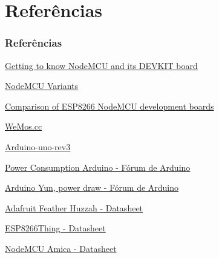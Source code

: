 \documentclass{beamer}
\begin{document}
\section{Referências}
\begin{frame}
\frametitle{Referências}
\begin{thebibliography}{5}
	

	
	\href{https://www.ibm.com/developerworks/library/iot-nodemcu-open-why-use/index.html} {Getting to know NodeMCU and its DEVKIT board}
	
	\href{https://cknodemcu.wordpress.com/2015/11/13/nodemcu-variants/} {NodeMCU Variants}
	
	 \href{https://frightanic.com/iot/comparison-of-esp8266-nodemcu-development-boards/}{Comparison of ESP8266 NodeMCU development boards}
	
	 \href{https://www.wemos.cc/}{WeMos.cc}
	
	\href{https://store.arduino.cc/arduino-uno-rev3} {Arduino-uno-rev3}
	
	\href{http://forum.arduino.cc/index.php?topic=5536.0}{Power Consumption Arduino - Fórum de Arduino}
	
	\href{https://forum.arduino.cc/index.php?topic=188821.0} {Arduino Yun, power draw - Fórum de Arduino}

	\href{https://cdn-learn.adafruit.com/downloads/pdf/adafruit-feather-huzzah-esp8266.pdf}{Adafruit Feather Huzzah - Datasheet}

	\href{https://cdn.sparkfun.com/datasheets/Wireless/WiFi/ESP8266ThingV1.pdf}{ESP8266Thing - Datasheet}
	
	\href{https://github.com/nodemcu/nodemcu-devkit-v1.0/blob/master/NODEMCU_DEVKIT_V1.0.PDF}{NodeMCU Amica - Datasheet}
	



\end{thebibliography}

\end{frame}
\end{document}
